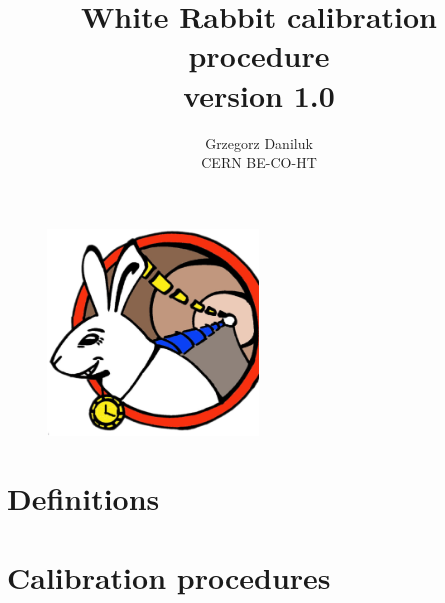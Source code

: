 \documentclass[a4paper, 12pt]{article}
\begin{document}
\title{White Rabbit calibration procedure\\[0.5cm]
\large {version 1.0}}
\author{Grzegorz Daniluk\\ CERN BE-CO-HT}

\maketitle
\thispagestyle{empty}

\begin{figure}[ht!]
  \centering
  \vspace{1.3cm}
  \includegraphics[width=0.50\textwidth]{../../figures/logo/WRlogo.ps}
  \label{fig:wr_logo}
\end{figure}

\newpage

\newpage

\newpage

\tableofcontents

\newpage


\newpage
\section{Definitions}


\newpage


\newpage
\section{Calibration procedures}
\label{sec:calib_proc}


\newpage


\newpage


\appendix
\newpage

\newpage


\newpage


\end{document}

